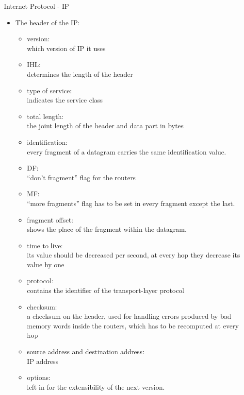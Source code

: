 \documentclass[margin=0px]{article}
\begin{document}
\begin{description}
        Internet Protocol - IP
        \begin{itemize}
            \item The header of the IP:
                  \begin{itemize}
                      \item version:\\
                            which version of IP it uses
                      \item IHL: \\
                            determines the length of the header
                      \item type of service: \\
                            indicates the service class
                      \item total length: \\
                            the joint length of the header and data part in bytes
                      \item identification: \\
                            every fragment of a datagram carries the same identification value.
                      \item DF: \\
                            ``don't fragment'' flag for the routers
                      \item MF: \\
                            ``more fragments'' flag has to be set in every fragment except the last.
                      \item fragment offset: \\
                            shows the place of the fragment within the datagram.
                      \item time to live: \\
                            its value should be decreased per second, at every hop they decrease its value by one
                      \item protocol: \\
                            contains the identifier of the transport-layer protocol
                      \item checksum: \\
                            a checksum on the header, used for handling errors produced by bad memory words inside the routers, which has to be recomputed at every hop
                      \item source address and destination address: \\
                            IP address
                      \item options: \\
                            left in for the extensibility of the next version.
                  \end{itemize}


\end{itemize}
\end{description}
\end{document}
